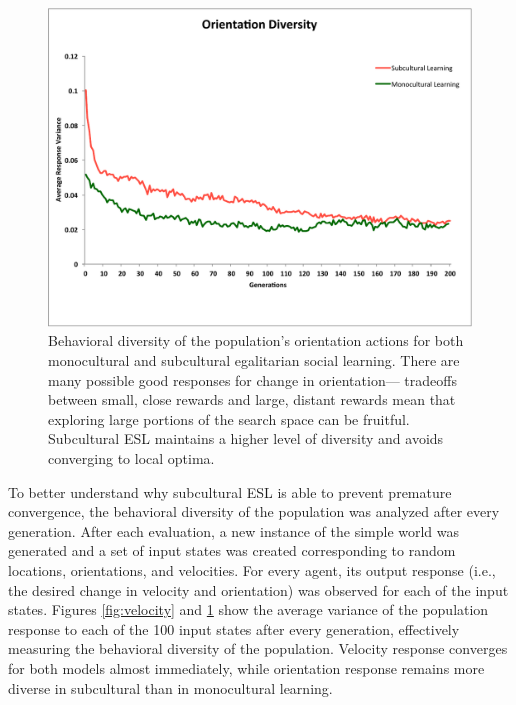 \documentclass{sig-alternate}
\begin{document}
\begin{figure}
  \centering
    \includegraphics[scale=.41]{orientation_diversity.pdf}
  \caption{Behavioral diversity of the population's orientation actions for both monocultural and subcultural egalitarian social learning.   There are many possible good responses for change in orientation--- tradeoffs between small, close rewards and large, distant rewards mean that exploring large portions of the search space can be fruitful.  Subcultural ESL maintains a higher level of diversity and avoids converging to local optima.}
\label{fig:orientation}
\end{figure}

To better understand why subcultural ESL is able to prevent premature convergence, the behavioral diversity of the population was analyzed after every generation. After each evaluation, a new instance of the simple world was generated and a set of input states was created corresponding to random locations, orientations, and velocities. For every agent, its output response (i.e., the desired change in velocity and orientation) was observed for each of the input states. Figures \ref{fig:velocity} and \ref{fig:orientation} show the average variance of the population response to each of the 100 input states after every generation, effectively measuring the behavioral diversity of the population.  Velocity response converges for both models almost immediately, while orientation response remains more diverse in subcultural than in monocultural learning.
\end{document}
